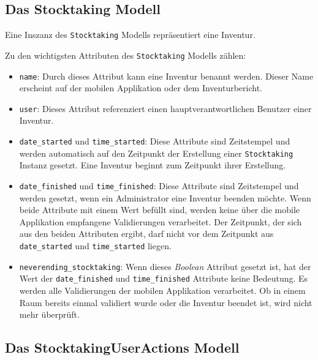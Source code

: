 \hypertarget{das-stocktaking-modell}{%
\subsection{Das Stocktaking Modell}\label{das-stocktaking-modell}}

Eine Inszanz des \texttt{Stocktaking} Modells repräsentiert eine
Inventur.

Zu den wichtigsten Attributen des \texttt{Stocktaking} Modells zählen:

\begin{itemize}
\tightlist
\item
  \texttt{name}: Durch dieses Attribut kann eine Inventur benannt
  werden. Dieser Name erscheint auf der mobilen Applikation oder dem
  Inventurbericht.
\item
  \texttt{user}: Dieses Attribut referenziert einen
  hauptverantwortlichen Benutzer einer Inventur.
\item
  \texttt{date\_started} und \texttt{time\_started}: Diese Attribute
  sind Zeitstempel und werden automatisch auf den Zeitpunkt der
  Erstellung einer \texttt{Stocktaking} Instanz gesetzt. Eine Inventur
  beginnt zum Zeitpunkt ihrer Erstellung.
\item
  \texttt{date\_finished} und \texttt{time\_finished}: Diese Attribute
  sind Zeitstempel und werden gesetzt, wenn ein Administrator eine
  Inventur beenden möchte. Wenn beide Attribute mit einem Wert befüllt
  sind, werden keine über die mobile Applikation empfangene
  Validierungen verarbeitet. Der Zeitpunkt, der sich aus den beiden
  Attributen ergibt, darf nicht vor dem Zeitpunkt aus
  \texttt{date\_started} und \texttt{time\_started} liegen.
\item
  \texttt{neverending\_stocktaking}: Wenn dieses
  \emph{Boolean}
  Attribut gesetzt ist, hat der Wert der \texttt{date\_finished} und
  \texttt{time\_finished} Attribute keine Bedeutung. Es werden alle
  Validierungen der mobilen Applikation verarbeitet. Ob in einem Raum
  bereits einmal validiert wurde oder die Inventur beendet ist, wird
  nicht mehr überprüft.
\end{itemize}

\hypertarget{das-stocktakinguseractions-modell}{%
\subsection{Das StocktakingUserActions
Modell}\label{das-stocktakinguseractions-modell}}

